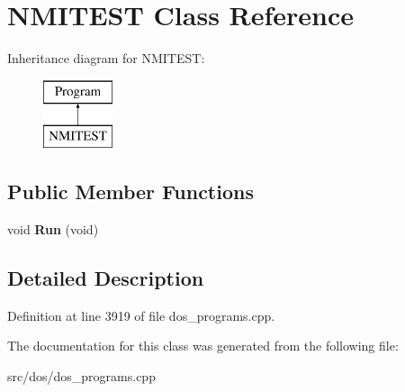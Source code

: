 \hypertarget{classNMITEST}{\section{N\-M\-I\-T\-E\-S\-T Class Reference}
\label{classNMITEST}
}
Inheritance diagram for N\-M\-I\-T\-E\-S\-T\-:\begin{figure}[H]
\begin{center}
\leavevmode
\includegraphics[height=2.000000cm]{classNMITEST}
\end{center}
\end{figure}
\subsection*{Public Member Functions}
\begin{DoxyCompactItemize}
\item 
\hypertarget{classNMITEST_a5ce5aded9d44d5eacd3c640455207076}{void {\bfseries Run} (void)}\label{classNMITEST_a5ce5aded9d44d5eacd3c640455207076}

\end{DoxyCompactItemize}


\subsection{Detailed Description}


Definition at line 3919 of file dos\-\_\-programs.\-cpp.



The documentation for this class was generated from the following file\-:\begin{DoxyCompactItemize}
\item 
src/dos/dos\-\_\-programs.\-cpp\end{DoxyCompactItemize}
